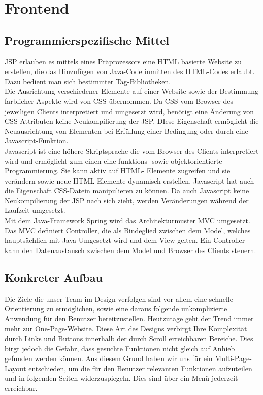 \section{Frontend} 


\subsection{Programmierspezifische Mittel}
\medskip
\ac{JSP} erlauben es mittels eines Präprozessors eine HTML basierte 
Website zu erstellen, die das Hinzufügen von Java-Code inmitten des HTML-Codes erlaubt. Dazu bedient 
man sich bestimmter Tag-Bibliotheken. \\
Die Ausrichtung verschiedener Elemente auf einer Website sowie der Bestimmung farblicher 
Aspekte wird von CSS übernommen. Da CSS vom Browser des jeweiligen Clients interpretiert und umgesetzt wird, benötigt eine Änderung von CSS-Attributen keine Neukompilierung der \acs{JSP}. DIese Eigenschaft ermöglicht 
die Neuausrichtung von Elementen bei Erfüllung einer Bedingung oder durch eine Javascript-Funktion. \\
Javascript ist eine höhere Skriptsprache die vom Browser des Clients interpretiert wird und 
ermöglicht zum einen eine funktions- sowie objektorientierte Programmierung. Sie kann aktiv auf HTML-
Elemente  zugreifen und sie verändern sowie neue HTML-Elemente dynamisch erstellen. 
Javascript hat auch die Eigenschaft CSS-Datein manipulieren zu können. Da auch Javascript keine 
Neukompilierung der JSP nach sich zieht, werden Veränderungen während der Laufzeit umgesetzt.\\
Mit dem Java-Framework Spring wird das Architekturmuster MVC umgesetzt. Das MVC definiert Controller, 
die als Bindeglied zwischen dem Model, welches  hauptsächlich  mit Java Umgesetzt wird und dem View 
gelten. Ein Controller kann den Datenaustausch zwischen dem Model und Browser des Clients steuern.

\subsection{Konkreter Aufbau}
Die Ziele die unser Team im Design verfolgen sind vor allem eine schnelle Orientierung zu ermöglichen, sowie eine daraus folgende unkomplizierte Anwendung für den Benutzer bereitzustellen. Heutzutage geht der Trend immer mehr zur One-Page-Website. Diese Art des Designs verbirgt Ihre Komplexität durch Links und Buttons innerhalb der durch Scroll erreichbaren Bereiche. Dies birgt jedoch die Gefahr, dass gesuchte Funktionen nicht gleich auf Anhieb gefunden werden können. Aus diesem Grund haben wir uns für ein Multi-Page-Layout entschieden, um die für den Benutzer relevanten Funktionen aufzuteilen und in folgenden Seiten widerzuspiegeln. Dies sind über ein Menü jederzeit erreichbar. 

